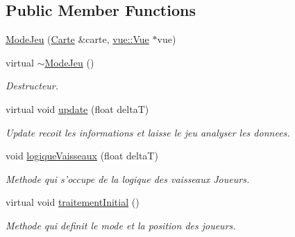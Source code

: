 \subsection*{Public Member Functions}
\begin{DoxyCompactItemize}
\item 
\hyperlink{group__inf2990_ga8e1c11efcd2c69971fb4862da5a9307e}{Mode\-Jeu} (\hyperlink{class_carte}{Carte} \&carte, \hyperlink{classvue_1_1_vue}{vue\-::\-Vue} $\ast$vue)
\item 
\hypertarget{group__inf2990_gabe9c0c22f3c612975783b898cb873b9e}{virtual \hyperlink{group__inf2990_gabe9c0c22f3c612975783b898cb873b9e}{$\sim$\-Mode\-Jeu} ()}\label{group__inf2990_gabe9c0c22f3c612975783b898cb873b9e}

\begin{DoxyCompactList}\small\item\em Destructeur. \end{DoxyCompactList}\item 
\hypertarget{group__inf2990_ga9dc0e59a90ca442a5ca07e810e8eaa62}{virtual void \hyperlink{group__inf2990_ga9dc0e59a90ca442a5ca07e810e8eaa62}{update} (float delta\-T)}\label{group__inf2990_ga9dc0e59a90ca442a5ca07e810e8eaa62}

\begin{DoxyCompactList}\small\item\em Update recoit les informations et laisse le jeu analyser les donnees. \end{DoxyCompactList}\item 
void \hyperlink{group__inf2990_gaf96271bae84dac32f8dd5ce7e7eb4bb7}{logique\-Vaisseaux} (float delta\-T)
\begin{DoxyCompactList}\small\item\em Methode qui s'occupe de la logique des vaisseaux Joueurs. \end{DoxyCompactList}\item 
\hypertarget{group__inf2990_ga46958594262809ada6a0bcf7bc53bd2c}{virtual void \hyperlink{group__inf2990_ga46958594262809ada6a0bcf7bc53bd2c}{traitement\-Initial} ()}\label{group__inf2990_ga46958594262809ada6a0bcf7bc53bd2c}

\begin{DoxyCompactList}\small\item\em Methode qui definit le mode et la position des joueurs. \end{DoxyCompactList}\end{DoxyCompactItemize}
